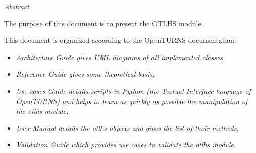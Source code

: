 %

\vspace{0.5in}
\begin{center}
\vspace{0.3in}
\emph{ Abstract}
\vspace{0.5in}
\end{center}

The purpose of this document is to present the OTLHS module.

This document is organized according to the OpenTURNS documentation:
\begin{itemize}
\item \itshape{Architecture Guide} gives UML diagrams of all implemented classes,
\item \itshape{Reference Guide} gives some theoretical basis,
\item \itshape{Use cases Guide} details scripts in Python (the Textual Interface language of OpenTURNS) and helps to learn as quickly as possible the manipulation of the \textit{otlhs} module,
\item \itshape{User Manual} details the \textit{otlhs} objects and gives the list of their methods,
\item \itshape{Validation Guide} which provides use cases to validate the \textit{otlhs} module.
\end{itemize}

